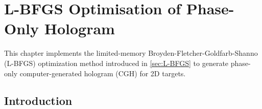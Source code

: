 \chapter{L-BFGS Optimisation of Phase-Only Hologram}
\label{chapter:L-BFGS Optimisation of Phase-Only Hologram}

\graphicspath{{Chapter_Optim2D/Figs/}}


This chapter implements the limited-memory Broyden-Fletcher-Goldfarb-Shanno (L-BFGS) optimization method introduced in \cref{sec:L-BFGS} to generate phase-only computer-generated hologram (CGH) for 2D targets.

\section{Introduction}

